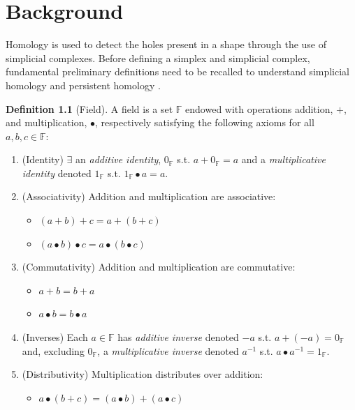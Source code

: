 \documentclass[ma]{uncgdissertationexp}
\theoremstyle{plain}
\theoremstyle{definition}
\newtheorem{definition}[theorem]{Definition}
\theoremstyle{remark}
\begin{document}
\chapter{Background}

\par Homology is used to detect the holes present in a shape through the use of simplicial complexes. Before defining a simplex and simplicial complex, fundamental preliminary definitions need to be recalled to understand simplicial homology and persistent homology \cite{Needham_2019}.

\begin{definition}[Field]
A field is a set $\mathbb{F}$ endowed with operations addition, $+$, and multiplication, $\bullet$, respectively satisfying the following axioms for all $a,b,c\in\mathbb{F}$:
\begin{enumerate}
\item (Identity) $\exists$ an \textit{additive identity}, $0_{\mathbb{F}}$ s.t. $a+0_{\mathbb{F}}=a$ and a \textit{multiplicative identity} denoted $1_{\mathbb{F}}$ s.t. $1_{\mathbb{F}}\bullet a = a$.
\item (Associativity) Addition and multiplication are associative:
\begin{itemize}
\item $(a+b) + c = a + (b+c)$
\item $(a\bullet b) \bullet c = a \bullet (b \bullet c)$
\end{itemize}
\item (Commutativity) Addition and multiplication are commutative:
\begin{itemize}
\item $a + b = b + a$
\item $a \bullet b = b \bullet a$
\end{itemize}
\item (Inverses) Each $a \in \mathbb{F}$ has \textit{additive inverse} denoted $-a$ s.t. $a + (-a) = 0_{\mathbb{F}}$ and, excluding $0_\mathbb{F}$, a \textit{multiplicative inverse} denoted $a^{-1}$ s.t. $a \bullet a^{-1}=1_\mathbb{F}$.
\item (Distributivity) Multiplication distributes over addition:
\begin{itemize}
\item $a \bullet (b+c) = (a \bullet b) + (a \bullet c)$
\end{itemize}
\end{enumerate}
\end{definition}
\end{document}

